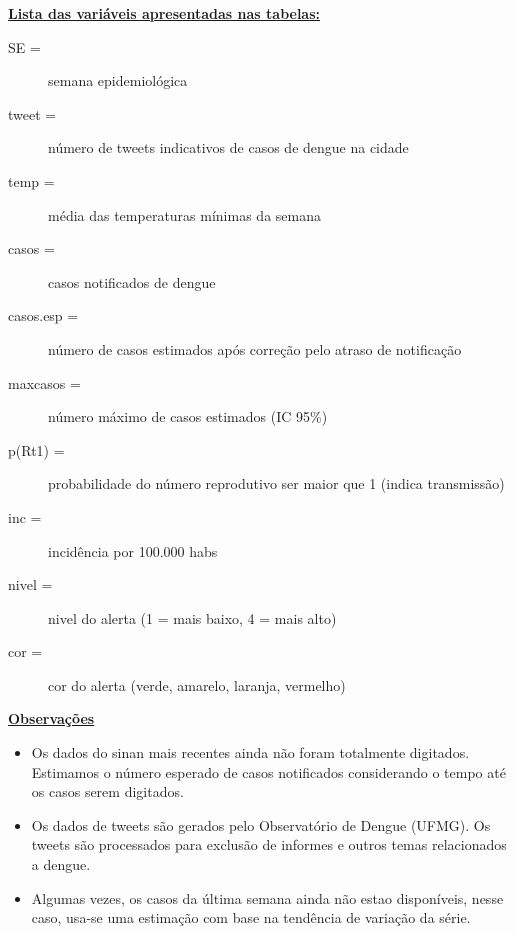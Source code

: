 \documentclass[10pt]{article} %
\begin{document}
\begin{minipage}[t]{1\linewidth} 

\centering
\hypertarget{notas}{} %

\hyperlink{vartab}{\textbf{Lista das variáveis apresentadas nas tabelas:}}

\begin{description}
\item[SE =] semana epidemiológica
\item [tweet =] número de tweets indicativos de casos de dengue na cidade
\item [temp =] média das temperaturas mínimas da semana
\item [casos =] casos notificados de dengue 
\item [casos.esp =] número de casos estimados após correção pelo atraso de notificação
\item [maxcasos =] número máximo de casos estimados (IC 95\%)
\item [p(Rt1) =] probabilidade do número reprodutivo ser maior que 1 (indica transmissão)
\item [inc =] incidência por 100.000 habs
\item [nivel =] nivel do alerta (1 = mais baixo, 4 = mais alto)
\item [cor =] cor do alerta (verde, amarelo, laranja, vermelho)\\
\end{description}

\hyperlink{notas}{\textbf{Observações}}\\

\begin{itemize}
\item Os dados do sinan mais recentes ainda não foram totalmente digitados. Estimamos o número esperado de casos notificados considerando o tempo até os casos serem digitados.\\ 
\item Os dados de tweets são gerados pelo Observatório de Dengue (UFMG). Os tweets são processados para exclusão de informes e outros temas relacionados a dengue.\\
\item Algumas vezes, os casos da última semana ainda não estao disponíveis, nesse caso, usa-se uma estimação com base na tendência de variação da série.\\
\end{itemize}


\end{minipage}
\end{document}
